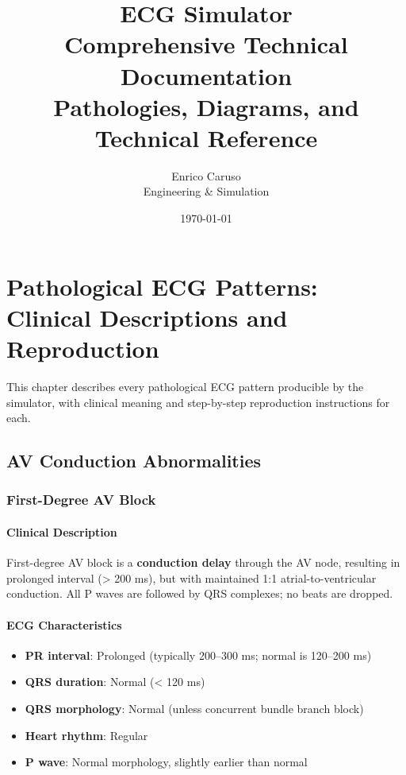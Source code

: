 \documentclass[12pt,a4paper,oneside]{book}
\title{\Large \textbf{ECG Simulator}\\
        \large Comprehensive Technical Documentation\\
        \normalsize Pathologies, Diagrams, and Technical Reference}
\author{Enrico Caruso\\Engineering \& Simulation}
\date{\today}
\begin{document}
\frontmatter

\tableofcontents
\listoffigures
\listoftables

\mainmatter

\chapter{Pathological ECG Patterns: Clinical Descriptions and Reproduction}

This chapter describes every pathological ECG pattern producible by the simulator, with clinical meaning and step-by-step reproduction instructions for each.

\section{AV Conduction Abnormalities}

\subsection{First-Degree AV Block}

\subsubsection{Clinical Description}

First-degree AV block is a \textbf{conduction delay} through the AV node, resulting in prolonged \PR interval (> 200 ms), but with maintained 1:1 atrial-to-ventricular conduction. All P waves are followed by QRS complexes; no beats are dropped.

\subsubsection{ECG Characteristics}

\begin{itemize}
    \item \textbf{PR interval}: Prolonged (typically 200–300 ms; normal is 120–200 ms)
    \item \textbf{QRS duration}: Normal (< 120 ms)
    \item \textbf{QRS morphology}: Normal (unless concurrent bundle branch block)
    \item \textbf{Heart rhythm}: Regular
    \item \textbf{P wave}: Normal morphology, slightly earlier than normal
\end{itemize}
\end{document}
